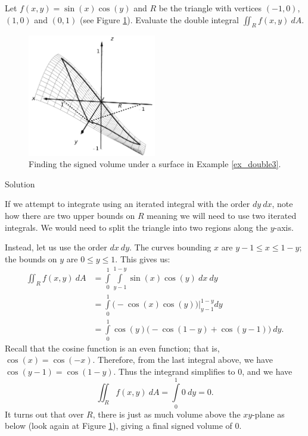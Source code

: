 \begin{example}\label{ex_double3}
Let $f(x,y) = \sin(x)\cos(y)$ and $R$ be the triangle with vertices $(-1,0)$, $(1,0)$ and $(0,1)$ (see Figure \ref{fig_multiple_9}). Evaluate the double integral $\iint_Rf(x,y)\ dA$.

\begin{figure}[H]
	\begin{center}			\includegraphics[width=0.5\textwidth]{fig_multiple_9}
	\caption{Finding the signed volume under a surface in Example \ref{ex_double3}.}
	\label{fig_multiple_9}
	\end{center}
\end{figure}


Solution 


If we attempt to integrate using an iterated integral with the order $dy\ dx$, note how there are two upper bounds on $R$ meaning we will need to use two iterated integrals. We would need to split the triangle into two regions along the $y$-axis.

Instead, let us use the order $dx\ dy$. The curves bounding $x$ are $y-1\leq x\leq 1-y$; the bounds on $y$ are $0\leq y\leq 1$. This gives us:
\allowdisplaybreaks
\begin{align*}
\iint_R f(x,y)\ dA &= \int\limits_0^1\int\limits_{y-1}^{1-y}\sin(x)\cos(y)\ dx\ dy\\
		&= \int\limits_0^1\left.\Big( -\cos(x)\cos(y)\Big)\right|_{y-1}^{1-y} dy\\
		&= \int\limits_0^1 \cos(y)\Big(-\cos(1-y) + \cos(y-1)\Big)\ dy.
\end{align*}
Recall that the cosine function is an even function; that is, $\cos(x) = \cos(-x)$. Therefore, from the last integral above, we have $\cos(y-1) = \cos(1-y)$. Thus the integrand simplifies to 0, and we have 
$$
\iint_R f(x,y)\ dA = \int\limits_0^1 0\ dy = 0.
$$
It turns out that over $R$, there is just as much volume above the $xy$-plane as below (look again at Figure \ref{fig_multiple_9}), giving a final signed volume of 0. 
\end{example}

